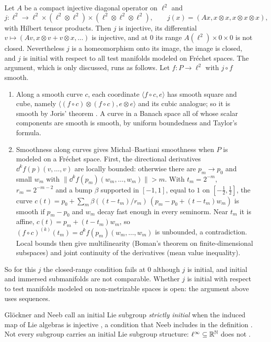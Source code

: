 \begin{remark}
  \label{rem:sub-initial-not-immersion}
  Let $A$ be a compact injective diagonal operator on $\ell^2$ and
  \[
    j \colon \ell^2 \to \ell^2 \times (\ell^2 \otimes \ell^2) \times
      (\ell^2 \otimes \ell^2 \otimes \ell^2), \qquad
    j(x) = (Ax, x \otimes x, x \otimes x \otimes x),
  \]
  with Hilbert tensor products. Then $j$ is injective, its differential
  $v \mapsto (Av, x \otimes v + v \otimes x, \dots)$ is injective, and at $0$ its range
  $A(\ell^2) \times 0 \times 0$ is not closed. Nevertheless $j$ is a homeomorphism onto its
  image, the image is closed, and $j$ is initial with respect to all test manifolds modeled on
  Fréchet spaces. The argument, which is only discussed, runs as follows. Let $f \colon P \to
  \ell^2$ with $j \circ f$ smooth.
  \begin{enumerate}
    \item Along a smooth curve $c$, each coordinate $\langle f \circ c, e\rangle$ has smooth
      square and cube, namely $\langle (f \circ c) \otimes (f \circ c), e \otimes e\rangle$ and
      its cubic analogue; so it is smooth by Joris' theorem \cite{Jor82}. A curve in a Banach
      space all of whose scalar components are smooth is smooth, by uniform boundedness and
      Taylor's formula.
    \item Smoothness along curves gives Michal--Bastiani smoothness when $P$ is modeled on a
      Fréchet space. First, the directional derivatives $\dd^k f(p)(v, \dots, v)$ are locally
      bounded: otherwise there are $p_m \to p_0$ and small $w_m$ with
      $\|\dd^k f(p_m)(w_m, \dots, w_m)\| > m$. With $t_m = 2^{-m}$, $r_m = 2^{-m-2}$ and a bump
      $\beta$ supported in $[-1,1]$, equal to $1$ on $[-\tfrac12, \tfrac12]$, the curve
      $c(t) = p_0 + \sum_m \beta((t - t_m)/r_m)\,(p_m - p_0 + (t - t_m)w_m)$ is smooth if
      $p_m - p_0$ and $w_m$ decay fast enough in every seminorm. Near $t_m$ it is affine,
      $c(t) = p_m + (t - t_m)w_m$, so $(f \circ c)^{(k)}(t_m) = \dd^k f(p_m)(w_m, \dots, w_m)$
      is unbounded, a contradiction. Local bounds then give multilinearity (Boman's theorem on
      finite-dimensional subspaces) and joint continuity of the derivatives (mean value
      inequality).
  \end{enumerate}
  So for this $j$ the closed-range condition fails at $0$ although $j$ is initial, and initial
  and immersed submanifolds are not comparable. Whether $j$ is initial with respect to test
  manifolds modeled on non-metrizable spaces is open: the argument above uses sequences.
\end{remark}

\begin{remark}
  \label{rem:sub-initial-lie}
  Glöckner and Neeb call an initial Lie subgroup \emph{strictly initial} when the induced map
  of Lie algebras is injective \cite[Def.~9.1.5]{GN26}, a condition that Neeb includes in the
  definition \cite{Nee06}. Not every subgroup carries an initial Lie subgroup structure:
  $\ell^\infty \subseteq \mathbb{R}^{\mathbb{N}}$ does not \cite[Ex.~9.1.8]{GN26}.
\end{remark}
